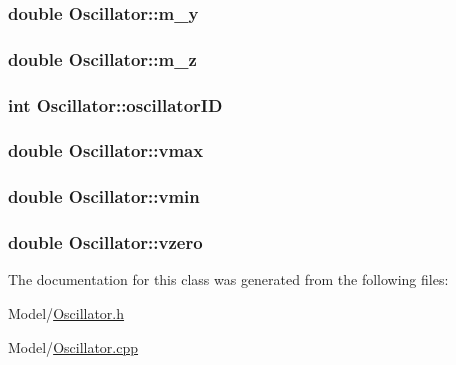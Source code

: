 \hypertarget{class_oscillator_a6936c789a75680f0486c817af4fce202}{
\subsubsection[{m\+\_\+y}]{\setlength{\rightskip}{0pt plus 5cm}double Oscillator\+::m\+\_\+y}}\label{class_oscillator_a6936c789a75680f0486c817af4fce202}
\hypertarget{class_oscillator_ae00491a4783797fb6edb9c3d5317a6ad}{
\subsubsection[{m\+\_\+z}]{\setlength{\rightskip}{0pt plus 5cm}double Oscillator\+::m\+\_\+z}}\label{class_oscillator_ae00491a4783797fb6edb9c3d5317a6ad}
\hypertarget{class_oscillator_acfc962cfc0b6c92fc8ae8d7254346bef}{
\subsubsection[{oscillator\+I\+D}]{\setlength{\rightskip}{0pt plus 5cm}int Oscillator\+::oscillator\+I\+D}}\label{class_oscillator_acfc962cfc0b6c92fc8ae8d7254346bef}
\hypertarget{class_oscillator_a43006eaf9a5a3b50a8f6a2a95ce47231}{
\subsubsection[{vmax}]{\setlength{\rightskip}{0pt plus 5cm}double Oscillator\+::vmax}}\label{class_oscillator_a43006eaf9a5a3b50a8f6a2a95ce47231}
\hypertarget{class_oscillator_a8912b5faff383dcc1a33554d2bcc5844}{
\subsubsection[{vmin}]{\setlength{\rightskip}{0pt plus 5cm}double Oscillator\+::vmin}}\label{class_oscillator_a8912b5faff383dcc1a33554d2bcc5844}
\hypertarget{class_oscillator_af6886099dfca8ec732676f4f89935651}{
\subsubsection[{vzero}]{\setlength{\rightskip}{0pt plus 5cm}double Oscillator\+::vzero}}\label{class_oscillator_af6886099dfca8ec732676f4f89935651}


The documentation for this class was generated from the following files\+:\begin{DoxyCompactItemize}
\item 
Model/\hyperlink{_oscillator_8h}{Oscillator.\+h}\item 
Model/\hyperlink{_oscillator_8cpp}{Oscillator.\+cpp}\end{DoxyCompactItemize}
